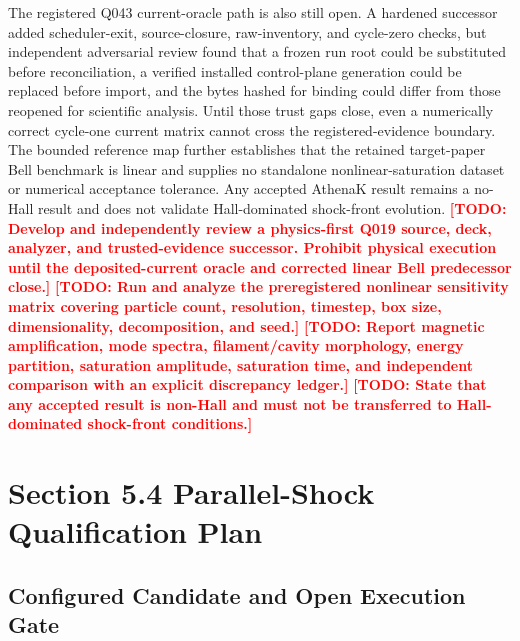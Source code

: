 \documentclass[twocolumn]{aastex701}
\newcommand{\TODO}[1]{\textcolor{red}{\textbf{[TODO: #1]}}}
\begin{document}
The registered Q043 current-oracle path is also still open. A hardened
successor added scheduler-exit, source-closure, raw-inventory, and cycle-zero
checks, but independent adversarial review found that a frozen run root could
be substituted before reconciliation, a verified installed control-plane
generation could be replaced before import, and the bytes hashed for binding
could differ from those reopened for scientific analysis. Until those trust
gaps close, even a numerically correct cycle-one current matrix cannot cross
the registered-evidence boundary. The bounded reference map further
establishes that the retained target-paper Bell benchmark is linear and
supplies no standalone nonlinear-saturation dataset or numerical acceptance
tolerance. Any accepted AthenaK result remains a no-Hall result and does not
validate Hall-dominated shock-front evolution.
\TODO{Develop and independently review a physics-first Q019 source, deck,
analyzer, and trusted-evidence successor. Prohibit physical execution until the
deposited-current oracle and corrected linear Bell predecessor close.}
\TODO{Run and analyze the preregistered nonlinear sensitivity matrix covering
particle count, resolution, timestep, box size, dimensionality, decomposition,
and seed.}
\TODO{Report magnetic amplification, mode spectra, filament/cavity morphology,
energy partition, saturation amplitude, saturation time, and independent
comparison with an explicit discrepancy ledger.}
\TODO{State that any accepted result is non-Hall and must not be transferred to
Hall-dominated shock-front conditions.}

\section{Section 5.4 Parallel-Shock Qualification Plan}
\label{sec:shock}

\subsection{Configured Candidate and Open Execution Gate}
\label{sec:shock-setup}
\end{document}
